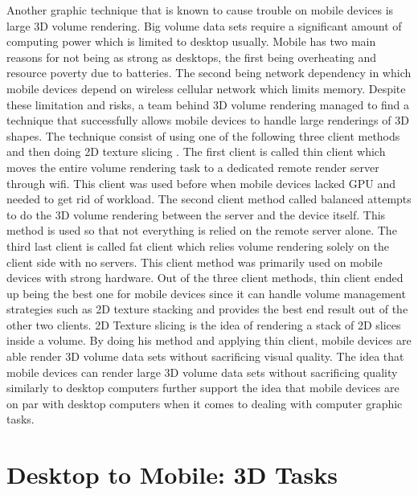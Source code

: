 \documentclass{article}
\begin{document}
   Another graphic technique that is known to cause trouble on mobile devices is large 3D volume rendering. Big volume data sets require a significant amount of computing power which is limited to desktop usually. Mobile has two main reasons for not being as strong as desktops, the first being overheating and resource poverty due to batteries. The second being network dependency in which mobile devices depend on wireless cellular network which limits memory. Despite these limitation and risks, a team behind 3D volume rendering managed to find a technique that successfully allows mobile devices to handle large renderings of 3D shapes. The technique consist of using one of the following three client methods and then doing 2D texture slicing \cite{7111373}. The first client is called thin client which moves the entire volume rendering task to a dedicated remote render server through wifi. This client was used before when mobile devices lacked GPU and needed to get rid of workload. The second client method called balanced attempts to do the 3D volume rendering between the server and the device itself. This method is used so that not everything is relied on the remote server alone. The third last client is called fat client which relies volume rendering solely on the client side with no servers. This client method was primarily used on mobile devices with strong hardware. Out of the three client methods, thin client ended up being the best one for mobile devices since it can handle volume management strategies such as 2D texture stacking and provides the best end result out of the other two clients. 2D Texture slicing is the idea of rendering a stack of 2D slices inside a volume. By doing his method and applying thin client, mobile devices are able render 3D volume data sets without sacrificing visual quality. The idea that mobile devices can render large 3D volume data sets without sacrificing quality similarly to desktop computers further support the idea that mobile devices are on par with desktop computers when it comes to dealing with computer graphic tasks.  
  
\section{Desktop to Mobile: 3D Tasks}
     
\end{document}
